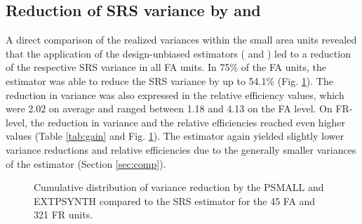\newpage
\subsection{Reduction of SRS variance by \psmall{} and \extpsynth{}}
\label{sec:gain_eval}

A direct comparison of the realized variances within the small area units revealed that the application of the design-unbiased estimators (\psmall{} and \extpsynth{}) led to a reduction of the respective SRS variance in all FA units. In 75\% of the FA units, the \extpsynth{} estimator was able to reduce the SRS variance by up to 54.1\% (Fig. \ref{fig:gain}). The reduction in variance was also expressed in the relative efficiency values, which were 2.02 on average and ranged between 1.18 and 4.13 on the FA level. On FR-level, the reduction in variance and the relative efficiencies reached even higher values (Table \ref{tab:gain} and Fig. \ref{fig:gain}). The \psmall{} estimator again yielded slightly lower variance reductions and relative efficiencies due to the generally smaller variances of the \extpsynth{} estimator (Section \ref{sec:comp}).

\begin{figure}[H]
	\centering
	\caption{Cumulative distribution of variance reduction by the PSMALL and EXTPSYNTH compared to the SRS estimator for the  45 FA and 321 FR units.}
	\label{fig:gain}
\end{figure}

